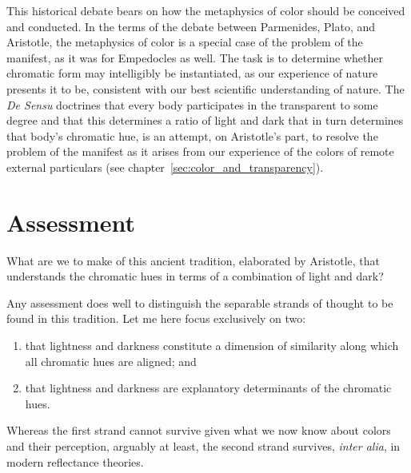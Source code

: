 This historical debate bears on how the metaphysics of color should be conceived and conducted. In the terms of the debate between Parmenides, Plato, and Aristotle, the metaphysics of color is a special case of the problem of the manifest, as it was for Empedocles as well. The task is to determine whether chromatic form may intelligibly be instantiated, as our experience of nature presents it to be, consistent with our best scientific understanding of nature. The \emph{De Sensu} doctrines that every body participates in the transparent to some degree and that this determines a ratio of light and dark that in turn determines that body's chromatic hue, is an attempt, on Aristotle's part, to resolve the problem of the manifest as it arises from our experience of the colors of remote external particulars (see chapter~\ref{sec:color_and_transparency}).



\section{Assessment} %
\label{sec:assessment}

What are we to make of this ancient tradition, elaborated by Aristotle, that understands the chromatic hues in terms of a combination of light and dark?

Any assessment does well to distinguish the separable strands of thought to be found in this tradition. Let me here focus exclusively on two:
\begin{enumerate}[(1)]
	\item that lightness and darkness constitute a dimension of similarity along which all chromatic hues are aligned; and
	\item that lightness and darkness are explanatory determinants of the chromatic hues.
\end{enumerate}
Whereas the first strand cannot survive given what we now know about colors and their perception, arguably at least, the second strand survives, \emph{inter alia}, in modern reflectance theories.

